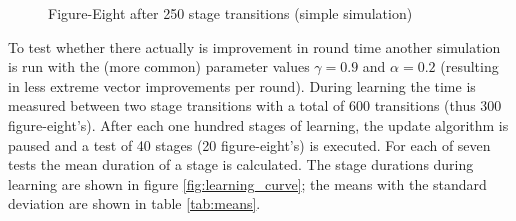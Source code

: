 \documentclass[11pt]{article}
\begin{document}
\begin{figure}[ht]
\centering



\caption{Figure-Eight after 250 stage transitions (simple simulation)}
\end{figure}


To test whether there actually is improvement in round time another simulation is run with the (more common) parameter values $\gamma = 0.9$ and $\alpha = 0.2$ (resulting in less extreme vector improvements per round). During learning the time is measured between two stage transitions with a total of 600 transitions (thus 300 figure-eight's). After each one hundred stages of learning, the update algorithm is paused and a test of 40 stages (20 figure-eight's) is executed. For each of seven tests the mean duration of a stage is calculated. The stage durations during learning are shown in figure \ref{fig:learning_curve}; the means with the standard deviation are shown in table \ref{tab:means}.
\end{document}
